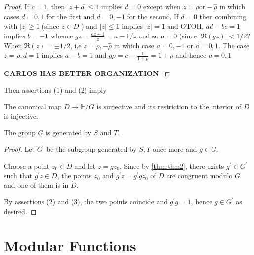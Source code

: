 \documentclass[12pt]{article}
\theoremstyle{definition}
\begin{document}
\begin{proof}
        If \( c=1\), then \(\vert z+d \vert \leq 1\) implies \(d=0\) except when \(z= \rho \mathrm{ or } -\hat{\rho } \) in which cases \(d=0,1\) for the first and \(d=0,-1\) for the second. If \(d=0\) then combining with \(\vert z \vert \geq 1\) (since \(z\in D\) ) and \( \vert z \vert \leq 1\) implies \(\vert z \vert =1\) and OTOH, \(ad-bc=1\) implies \(b=-1\) whence \(gz = \frac{az-1}{z} = a-1/z\) and so \(a=0\) (since \( \vert \Re (gz) \vert < 1/2\)? When \(\Re (z)=\pm 1/2\), i.e \(z=\rho , -\hat{\rho }\) in which case \(a=0,-1\) or \(a=0,1\). The case \(z=\rho,d=1\) implies \(a-b = 1\) and \(g \rho = a-\frac{1}{1+\rho } = 1+\rho  \) and hence \(a=0,1\) 
        
        \Large{\textbf{CARLOS HAS BETTER ORGANIZATION} }
    \end{proof}
    
    Then assertions (1) and (2) imply 
    \begin{cor}
    The canonical map \(D\to \mathbb{H} /G\) is surjective and its restriction to the interior of \(D\) is injective.
    \end{cor}
    \begin{thm}[label = gen]
    The group \(G\) is generated by \(S\) and \(T\).
    \end{thm}
    \begin{proof}
    Let \(G^{\prime} \) be the subgroup generated by \(S,T\) once more and \(g\in G\). 

    Choose a point \(z_0 \in \mathring{D}\) and let \(z=gz_0\). Since by \cref{thm:thm2}, there exists \(g^{\prime} \in G^{\prime} \) such that \(g^{\prime} z \in D\), the points \(z_0\) and \(g^{\prime} z=g^{\prime} gz_0\) of \(D\) are congruent modulo \(G\) and one of them is in \(\mathring{D}\). 
    
    By assertions (2) and (3), the two points coincide and \(g^{\prime} g=1\), hence \(g\in G^{\prime} \) as desired.
    \end{proof}
\newpage
\section{Modular Functions}
\end{document}
